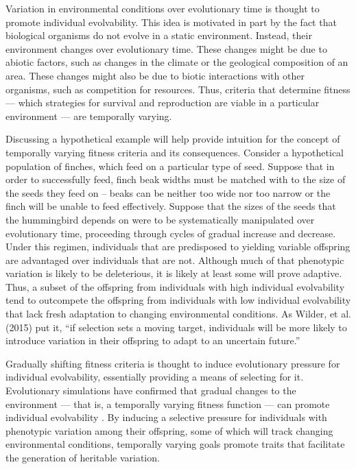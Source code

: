 Variation in environmental conditions over evolutionary time is thought to promote individual evolvability. This idea is motivated in part by the fact that biological organisms do not evolve in a static environment. Instead, their environment changes over evolutionary time. These changes might be due to abiotic factors, such as changes in the climate or the geological composition of an area. These changes might also be due to biotic interactions with other organisms, such as competition for resources. Thus, criteria that determine fitness --- which strategies for survival and reproduction are viable in a particular environment --- are temporally varying. 

Discussing a hypothetical example will help provide intuition for the concept of temporally varying fitness criteria and its consequences. Consider a hypothetical population of finches, which feed on a particular type of seed. Suppose that in order to successfully feed, finch beak widths must be matched with to the size of the seeds they feed on -- beaks can be neither too wide nor too narrow or the finch will be unable to feed effectively. Suppose that the sizes of the seeds that the hummingbird depends on were to be systematically manipulated over evolutionary time, proceeding through cycles of gradual increase and decrease. Under this  regimen, individuals that are predisposed to yielding variable offspring are advantaged over individuals that are not. Although much of that phenotypic variation is likely to be deleterious, it is likely at least some will prove adaptive. Thus, a subset of the offspring from individuals with high individual evolvability tend to outcompete the offspring from individuals with low individual evolvability that lack fresh adaptation to changing environmental conditions. As Wilder, et al. (2015) put it, ``if selection sets a moving target, individuals will be more likely to introduce variation in their offspring to adapt to an uncertain future.''  

Gradually shifting fitness criteria is thought to induce evolutionary pressure for individual evolvability, essentially providing a means of selecting for it. Evolutionary simulations have confirmed that gradual changes to the environment --- that is, a temporally varying fitness function --- can promote individual evolvability \cite{Kashtan2007VaryingEvolution, Wilder2015ReconcilingEvolvability}. By inducing a selective pressure for individuals with phenotypic variation among their offspring, some of which will track changing environmental conditions, temporally varying goals promote traits that facilitate the generation of heritable variation.
